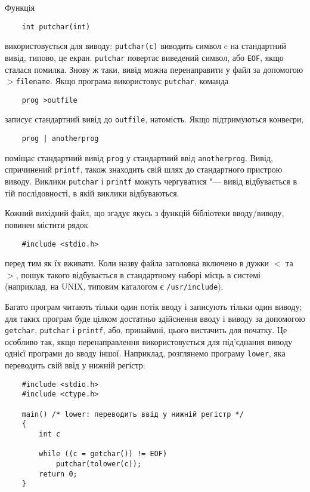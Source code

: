 \documentclass[a4paper,12pt]{book}
\begin{document}
  Функція
  \begin{verbatim}
    int putchar(int)
  \end{verbatim}
  використовується для виводу: \texttt{putchar(c)} виводить символ c на стандартний вивід,
  типово, це екран. \texttt{putchar} повертає виведений символ, або \texttt{EOF}, якщо
  сталася помилка. Знову ж таки, вивід можна перенаправити у файл за допомогою
  \texttt{\mbox{$>$}filename}. Якщо програма використовує \texttt{putchar}, команда
  \begin{verbatim}
    prog >outfile
  \end{verbatim}
  записує стандартний вивід до \texttt{outfile}, натомість. Якщо підтримуються конвеєри,
  \begin{verbatim}
    prog | anotherprog
  \end{verbatim}
  поміщає стандартний вивід \texttt{prog} у стандартний ввід \texttt{anotherprog}. Вивід,
  спричинений \texttt{printf}, також знаходить свій шлях до стандартного пристрою виводу.
  Виклики \texttt{putchar} і \texttt{printf} можуть чергуватися "--- вивід відбувається
  в тій послідовності, в якій виклики відбуваються.

  Кожний вихідний файл, що згадує якусь з функцій бібліотеки вводу/виводу, повинен
  містити рядок
  \begin{verbatim}
    #include <stdio.h>
  \end{verbatim}

  перед тим як їх вживати. Коли назву файла заголовка включено в дужки \texttt{\mbox{$<$}} та
  \texttt{\mbox{$>$}}, пошук такого відбувається в стандартному наборі місць в системі
  (наприклад, на UNIX, типовим каталогом є \texttt{/usr/include}).

  Багато програм читають тільки один потік вводу і записують тільки один виводу; для таких
  програм буде цілком достатньо здійснення вводу і виводу за допомогою \texttt{getchar},
  \texttt{putchar} і \texttt{printf}, або, принаймні, цього вистачить для початку. Це
  особливо так, якщо перенаправлення використовується для під'єднання виводу однієї
  програми до вводу іншої. Наприклад, розглянемо програму \texttt{lower}, яка переводить
  свій ввід у нижній регістр:
  \begin{verbatim}
    #include <stdio.h>
    #include <ctype.h>

    main() /* lower: переводить ввід у нижній регістр */
    {
        int c

        while ((c = getchar()) != EOF)
            putchar(tolower(c));
        return 0;
    }
  \end{verbatim}
\end{document}
